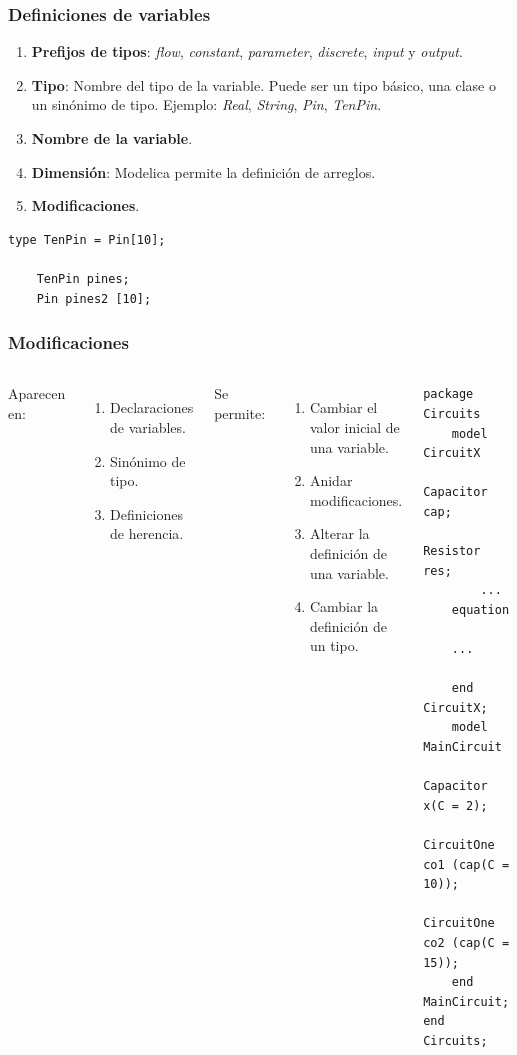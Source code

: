 \documentclass[aspectratio=169,10pt]{beamer}
\begin{document}
\begin{frame}[fragile]
\frametitle{Definiciones de variables} 
\begin{enumerate}
\item \textbf{Prefijos de tipos}: \textit{flow}, \textit{constant}, \textit{parameter}, \textit{discrete}, \textit{input} y \textit{output}.
\item \textbf{Tipo}: Nombre del tipo de la variable. Puede ser un tipo básico, una clase o un sinónimo de tipo.  Ejemplo: \textit{Real}, \textit{String}, \textit{Pin}, \textit{TenPin}.
\item \textbf{Nombre de la variable}. 
\item \textbf{Dimensión}: Modelica permite la definición de arreglos.
\item \textbf{Modificaciones}.
\end{enumerate}
\begin{lstlisting}[style=base]
    type TenPin = Pin[10];  
    
    TenPin pines;
    Pin pines2 [10];
\end{lstlisting}
\par

\end{frame}

\begin{frame}[fragile]
\frametitle{Modificaciones} 

\begin{columns}  
\column[T]{7cm}
Aparecen en: 
\begin{enumerate}
    \item Declaraciones de variables.
    \item Sinónimo de tipo.
    \item Definiciones de herencia.
\end{enumerate} 

Se permite:
\begin{enumerate}
    \item Cambiar el valor inicial de una variable.
    \item Anidar modificaciones.
    \item Alterar la definición de una variable.
    \item Cambiar la definición de un tipo.
\end{enumerate}
\column[T]{7cm}
\begin{lstlisting}[style=base]
package Circuits
    model CircuitX
        Capacitor cap;
        Resistor res;
        ...
    equation 
    
    ...
        
    end CircuitX;
    model MainCircuit
        Capacitor x(C = 2);
        CircuitOne co1 (cap(C = 10));
        CircuitOne co2 (cap(C = 15));
    end MainCircuit;
end Circuits;
\end{lstlisting}

 
\end{columns}
\end{frame}
\end{document}
